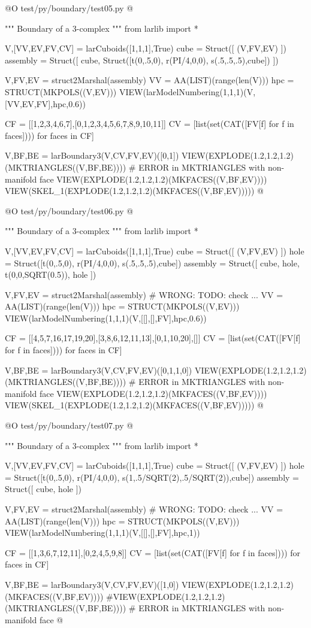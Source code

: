 \documentclass[11pt,oneside]{article}	%
\begin{document}
@O test/py/boundary/test05.py
@{""" Boundary of a 3-complex """
from larlib import *

V,[VV,EV,FV,CV] = larCuboids([1,1,1],True)
cube = Struct([ (V,FV,EV) ])
assembly = Struct([ cube, Struct([t(0,.5,0), r(PI/4,0,0), s(.5,.5,.5),cube]) ])

V,FV,EV = struct2Marshal(assembly)
VV = AA(LIST)(range(len(V)))
hpc = STRUCT(MKPOLS((V,EV)))
VIEW(larModelNumbering(1,1,1)(V,[VV,EV,FV],hpc,0.6))

CF = [[1,2,3,4,6,7],[0,1,2,3,4,5,6,7,8,9,10,11]]
CV = [list(set(CAT([FV[f]  for f in faces]))) for faces in CF]

V,BF,BE = larBoundary3(V,CV,FV,EV)([0,1])
VIEW(EXPLODE(1.2,1.2,1.2)(MKTRIANGLES((V,BF,BE)))) # ERROR in MKTRIANGLES with non-manifold face
VIEW(EXPLODE(1.2,1.2,1.2)(MKFACES((V,BF,EV))))
VIEW(SKEL_1(EXPLODE(1.2,1.2,1.2)(MKFACES((V,BF,EV)))))
@}

@O test/py/boundary/test06.py
@{""" Boundary of a 3-complex """
from larlib import *

V,[VV,EV,FV,CV] = larCuboids([1,1,1],True)
cube = Struct([ (V,FV,EV) ])
hole = Struct([t(0,.5,0), r(PI/4,0,0), s(.5,.5,.5),cube])
assembly = Struct([ cube, hole, t(0,0,SQRT(0.5)), hole ])

V,FV,EV = struct2Marshal(assembly) # WRONG:  TODO: check ...
VV = AA(LIST)(range(len(V)))
hpc = STRUCT(MKPOLS((V,EV)))
VIEW(larModelNumbering(1,1,1)(V,[[],[],FV],hpc,0.6))

CF = [[4,5,7,16,17,19,20],[3,8,6,12,11,13],[0,1,10,20],[]]
CV = [list(set(CAT([FV[f]  for f in faces]))) for faces in CF]

V,BF,BE = larBoundary3(V,CV,FV,EV)([0,1,1,0])
VIEW(EXPLODE(1.2,1.2,1.2)(MKTRIANGLES((V,BF,BE)))) # ERROR in MKTRIANGLES with non-manifold face
VIEW(EXPLODE(1.2,1.2,1.2)(MKFACES((V,BF,EV))))
VIEW(SKEL_1(EXPLODE(1.2,1.2,1.2)(MKFACES((V,BF,EV)))))
@}

@O test/py/boundary/test07.py
@{""" Boundary of a 3-complex """
from larlib import *

V,[VV,EV,FV,CV] = larCuboids([1,1,1],True)
cube = Struct([ (V,FV,EV) ])
hole = Struct([t(0,.5,0), r(PI/4,0,0), s(1,.5/SQRT(2),.5/SQRT(2)),cube])
assembly = Struct([ cube, hole ])

V,FV,EV = struct2Marshal(assembly) # WRONG:  TODO: check ...
VV = AA(LIST)(range(len(V)))
hpc = STRUCT(MKPOLS((V,EV)))
VIEW(larModelNumbering(1,1,1)(V,[[],[],FV],hpc,1))

CF = [[1,3,6,7,12,11],[0,2,4,5,9,8]]
CV = [list(set(CAT([FV[f]  for f in faces]))) for faces in CF]

V,BF,BE = larBoundary3(V,CV,FV,EV)([1,0])
VIEW(EXPLODE(1.2,1.2,1.2)(MKFACES((V,BF,EV))))
#VIEW(EXPLODE(1.2,1.2,1.2)(MKTRIANGLES((V,BF,BE)))) # ERROR in MKTRIANGLES with non-manifold face
@}
\end{document}
